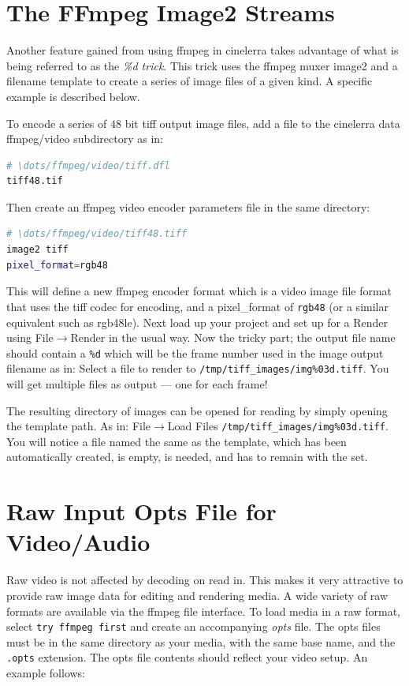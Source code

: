 \section{The FFmpeg Image2 Streams}%
\label{sec:ffmpeg_image2_streams}

Another feature gained from using ffmpeg in cinelerra takes advantage of what is being referred to as the \textit{\%d trick}.  This trick uses the ffmpeg muxer image2 and a filename template to create a series of image files of a given kind.  A specific example is described below.

To encode a series of $48$ bit tiff output image files, add a file to the cinelerra data ffmpeg/video subdirectory as in:

\begin{lstlisting}[language=bash]
# \dots/ffmpeg/video/tiff.dfl
tiff48.tif
\end{lstlisting}

Then create an ffmpeg video encoder parameters file in the same directory:

\begin{lstlisting}[language=bash]
# \dots/ffmpeg/video/tiff48.tiff
image2 tiff
pixel_format=rgb48
\end{lstlisting}

This will define a new ffmpeg encoder format which is a video image file format that uses the tiff codec for encoding, and a pixel\_format of \texttt{rgb48} (or a similar equivalent such as rgb48le).  Next load up your project and set up for a Render using File$\rightarrow$Render in the usual way.  Now the tricky part; the output file name should contain a \texttt{\%d} which will be the frame number used in the image output filename as in:  Select a file to render to  \texttt{/tmp/tiff\_images/img\%03d.tiff}.  You will get multiple files as output --- one for each frame!

The resulting directory of images can be opened for reading by simply opening the template path.  As in: File$\rightarrow$Load Files \texttt{/tmp/tiff\_images/img\%03d.tiff}.  You will notice a file named the same as the template, which has been automatically created, is empty, is needed, and has to remain with the set.

\section{Raw Input Opts File for Video/Audio}%
\label{sec:raw_input_opts_video_audio}

Raw video is not affected by decoding on read in.  This makes it very attractive to provide raw image data for editing and rendering media.  A wide variety of raw formats are available via the ffmpeg file interface.  To load media in a raw format, select \texttt{try ffmpeg first} and create an accompanying \textit{opts} file.  The opts files must be in the same directory as your media, with the same base name, and the \texttt{.opts} extension.  The opts file contents should reflect your video setup.  An example follows:

